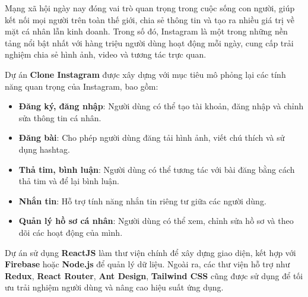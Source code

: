 
\vspace{0.5cm} %

Mạng xã hội ngày nay đóng vai trò quan trọng trong cuộc sống con người, giúp kết nối mọi người trên toàn thế giới, chia sẻ thông tin và tạo ra nhiều giá trị về mặt cá nhân lẫn kinh doanh. Trong số đó, Instagram là một trong những nền tảng nổi bật nhất với hàng triệu người dùng hoạt động mỗi ngày, cung cấp trải nghiệm chia sẻ hình ảnh, video và tương tác trực quan.

Dự án \textbf{Clone Instagram} được xây dựng với mục tiêu mô phỏng lại các tính năng quan trọng của Instagram, bao gồm:
\begin{itemize}
    \renewcommand{\labelitemi}{-} %
    \item \textbf{Đăng ký, đăng nhập}: Người dùng có thể tạo tài khoản, đăng nhập và chỉnh sửa thông tin cá nhân.
    \item \textbf{Đăng bài}: Cho phép người dùng đăng tải hình ảnh, viết chú thích và sử dụng hashtag.
    \item \textbf{Thả tim, bình luận}: Người dùng có thể tương tác với bài đăng bằng cách thả tim và để lại bình luận.
    \item \textbf{Nhắn tin}: Hỗ trợ tính năng nhắn tin riêng tư giữa các người dùng.
    \item \textbf{Quản lý hồ sơ cá nhân}: Người dùng có thể xem, chỉnh sửa hồ sơ và theo dõi các hoạt động của mình.
\end{itemize}

Dự án sử dụng \textbf{ReactJS} làm thư viện chính để xây dựng giao diện, kết hợp với \textbf{Firebase} hoặc \textbf{Node.js} để quản lý dữ liệu. Ngoài ra, các thư viện hỗ trợ như \textbf{Redux}, \textbf{React Router}, \textbf{Ant Design}, \textbf{Tailwind CSS} cũng được sử dụng để tối ưu trải nghiệm người dùng và nâng cao hiệu suất ứng dụng.\\ \\
